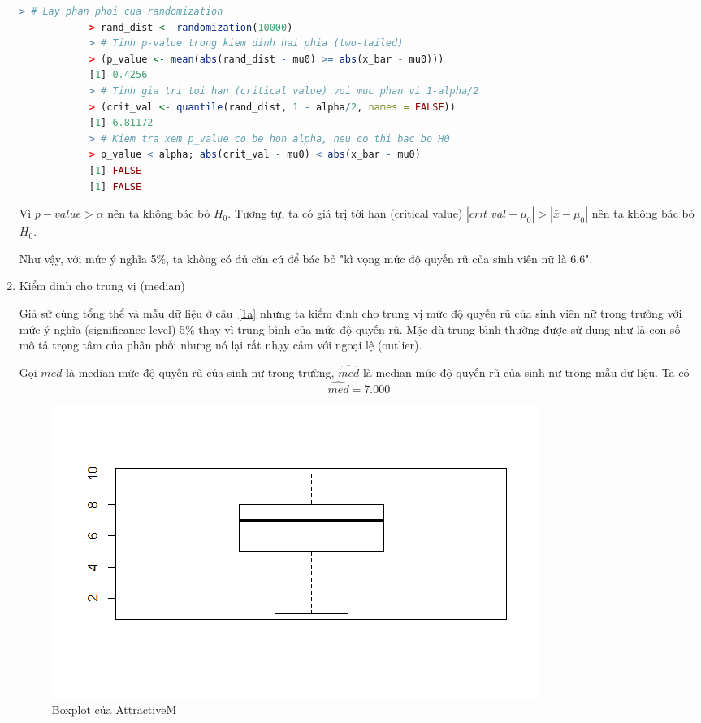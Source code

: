\documentclass[a4paper,12pt]{article}
\begin{document}
\begin{enumerate}[label = \alph*)]
\begin{lstlisting}[language=R]
			> # Lay phan phoi cua randomization
			> rand_dist <- randomization(10000)
			> # Tinh p-value trong kiem dinh hai phia (two-tailed)
			> (p_value <- mean(abs(rand_dist - mu0) >= abs(x_bar - mu0)))
			[1] 0.4256
			> # Tinh gia tri toi han (critical value) voi muc phan vi 1-alpha/2
			> (crit_val <- quantile(rand_dist, 1 - alpha/2, names = FALSE))
			[1] 6.81172
			> # Kiem tra xem p_value co be hon alpha, neu co thi bac bo H0
			> p_value < alpha; abs(crit_val - mu0) < abs(x_bar - mu0)
			[1] FALSE
			[1] FALSE
			\end{lstlisting}
			
			Vì $p-value > \alpha$ nên ta không bác bỏ $H_0$. Tương tự, ta có giá trị tới hạn (critical value) $|crit\_val - \mu_0| > |\bar{x} - \mu_0|$ nên ta không bác bỏ $H_0$. 
			
			Như vậy, với mức ý nghĩa 5\%, ta không có đủ căn cứ để bác bỏ "kì vọng mức độ quyến rũ của sinh viên nữ là $6.6$". 
			
		\item Kiểm định cho trung vị (median)
		
			Giả sử cùng tổng thể và mẫu dữ liệu ở câu~\ref{1a} nhưng ta kiểm định cho trung vị mức độ quyến rũ của sinh viên nữ trong trường với mức ý nghĩa (significance level) 5\% thay vì trung bình của mức độ quyến rũ. Mặc dù trung bình thường được sử dụng như là con số mô tả trọng tâm của phân phối nhưng nó lại rất nhạy cảm với ngoại lệ (outlier).
			
			Gọi $med$ là median mức độ quyến rũ của sinh nữ trong trường, $\hat{med}$ là median mức độ quyến rũ của sinh nữ trong mẫu dữ liệu. Ta có
			$$\hat{med} = 7.000$$
			
			\begin{figure}[H]
				\centering
				\includegraphics[width=0.7\linewidth]{Rplot2}
				\caption{Boxplot của AttractiveM}
				\label{fig:rplot2}
			\end{figure}
			

\end{enumerate}
\end{document}
